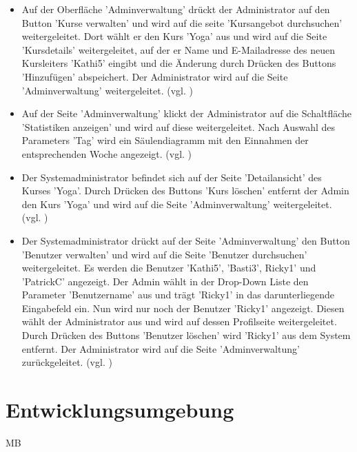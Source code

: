 \documentclass[a4paper]{scrreprt}
\begin{document}
\begin{itemize}
				\item {}
				Auf der Oberfläche 'Adminverwaltung' drückt der Administrator auf den Button 'Kurse verwalten' und wird auf die seite 'Kursangebot durchsuchen' weitergeleitet. Dort wählt er den Kurs 'Yoga' aus und wird auf die Seite 'Kursdetails' weitergeleitet, auf der er Name und E-Mailadresse des neuen Kursleiters 'Kathi5' eingibt und die Änderung durch Drücken des Buttons 'Hinzufügen' abspeichert. Der Administrator wird auf die Seite 'Adminverwaltung' weitergeleitet. (vgl. )
				
				\item {}
				Auf der Seite 'Adminverwaltung' klickt der Administrator auf die Schaltfläche 'Statistiken anzeigen' und wird auf diese weitergeleitet. Nach Auswahl des Parameters 'Tag' wird ein Säulendiagramm mit den Einnahmen der entsprechenden Woche angezeigt. (vgl. )
				
				\item {}
				Der Systemadministrator befindet sich auf der Seite 'Detailansicht' des Kurses 'Yoga'. Durch Drücken des Buttons 'Kurs löschen' entfernt der Admin den Kurs 'Yoga' und wird auf die Seite 'Adminverwaltung' weitergeleitet. (vgl. )
				
				\item {}
				Der Systemadministrator drückt auf der Seite 'Adminverwaltung' den Button 'Benutzer verwalten' und wird auf die Seite 'Benutzer durchsuchen' weitergeleitet. Es werden die Benutzer 'Kathi5', 'Basti3', Ricky1' und 'PatrickC' angezeigt. Der Admin wählt in der Drop-Down Liste den Parameter 'Benutzername' aus und trägt 'Ricky1' in das darunterliegende Eingabefeld ein. Nun wird nur noch der Benutzer 'Ricky1' angezeigt. Diesen wählt der Administrator aus und wird auf dessen Profilseite weitergeleitet. Durch Drücken des Buttons 'Benutzer löschen' wird 'Ricky1' aus dem System entfernt. Der Administrator wird auf die Seite 'Adminverwaltung' zurückgeleitet. (vgl. )
				
			\end{itemize}





\chapter{Entwicklungsumgebung}
\begin{tiny}
		MB
	\end{tiny}\\
\end{document}
